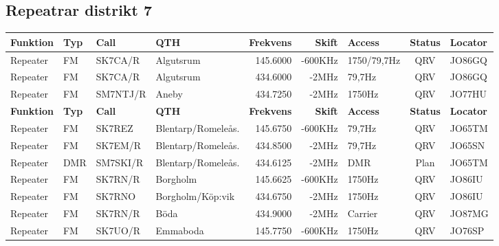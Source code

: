 \begin{landscape}
\subsection{Repeatrar distrikt 7}
\footnotesize
\begin{longtable}{llllrrlcl}
	\textbf{Funktion} & \textbf{Typ} & \textbf{Call} & \textbf{QTH}        & \textbf{Frekvens} & \textbf{Skift} & \textbf{Access} & \textbf{Status} & \textbf{Locator} \\ \hline
	Repeater          & FM           & SK7CA/R       & Algutsrum           &          145.6000 &        -600KHz & 1750/79,7Hz     &       QRV       & JO86GQ           \\
	Repeater          & FM           & SK7CA/R       & Algutsrum           &          434.6000 &          -2MHz & 79,7Hz          &       QRV       & JO86GQ           \\
	Repeater          & FM           & SM7NTJ/R      & Aneby               &          434.7250 &          -2MHz & 1750Hz          &       QRV       & JO77HU           \\
		\textbf{Funktion} & \textbf{Typ} & \textbf{Call} & \textbf{QTH}        & \textbf{Frekvens} & \textbf{Skift} & \textbf{Access} & \textbf{Status} & \textbf{Locator} \\ \hline
	Repeater          & FM           & SK7REZ        & Blentarp/Romeleås.  &          145.6750 &        -600KHz & 79,7Hz          &       QRV       & JO65TM           \\
	Repeater          & FM           & SK7EM/R       & Blentarp/Romeleås.  &          434.8500 &          -2MHz & 79,7Hz          &       QRV       & JO65SN           \\
	Repeater          & DMR          & SM7SKI/R      & Blentarp/Romeleås.  &          434.6125 &          -2MHz & DMR             &      Plan       & JO65TM           \\
	Repeater          & FM           & SK7RN/R       & Borgholm            &          145.6625 &        -600KHz & 1750Hz          &       QRV       & JO86IU           \\
	Repeater          & FM           & SK7RNO        & Borgholm/Köp:vik    &          434.6750 &          -2MHz & 1750Hz          &       QRV       & JO86IU           \\
	Repeater          & FM           & SK7RN/R       & Böda                &          434.9000 &          -2MHz & Carrier         &       QRV       & JO87MG           \\
	Repeater          & FM           & SK7UO/R       & Emmaboda            &          145.7750 &        -600KHz & 1750Hz          &       QRV       & JO76SP           \\

\end{longtable}
\end{landscape}
